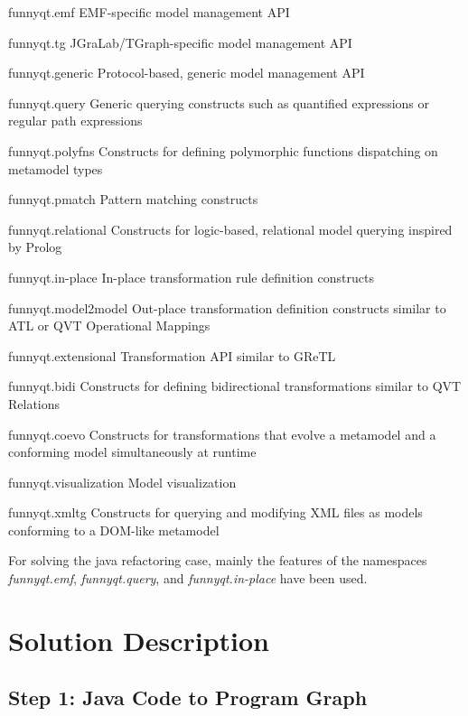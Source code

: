 \documentclass[submission]{eptcs}
\begin{document}
\begin{compactdesc}
\item[funnyqt.emf] EMF-specific model management API
\item[funnyqt.tg] JGraLab/TGraph-specific model management API
\item[funnyqt.generic] Protocol-based, generic model management API
\item[funnyqt.query] Generic querying constructs such as quantified expressions
  or regular path expressions
\item[funnyqt.polyfns] Constructs for defining polymorphic functions
  dispatching on metamodel types
\item[funnyqt.pmatch] Pattern matching constructs
\item[funnyqt.relational] Constructs for logic-based, relational model querying
  inspired by Prolog
\item[funnyqt.in-place] In-place transformation rule definition constructs
\item[funnyqt.model2model] Out-place transformation definition constructs
  similar to ATL or QVT Operational Mappings
\item[funnyqt.extensional] Transformation API similar to GReTL
\item[funnyqt.bidi] Constructs for defining bidirectional transformations
  similar to QVT Relations
\item[funnyqt.coevo] Constructs for transformations that evolve a metamodel and
  a conforming model simultaneously at runtime
\item[funnyqt.visualization] Model visualization
\item[funnyqt.xmltg] Constructs for querying and modifying XML files as models
  conforming to a DOM-like metamodel
\end{compactdesc}

For solving the java refactoring case, mainly the features of the namespaces
\emph{funnyqt.emf}, \emph{funnyqt.query}, and \emph{funnyqt.in-place} have been
used.


\section{Solution Description}
\label{sec:solution-description}

\subsection{Step 1: Java Code to Program Graph}
\label{sec:step-1:java-to-pg}
\end{document}
